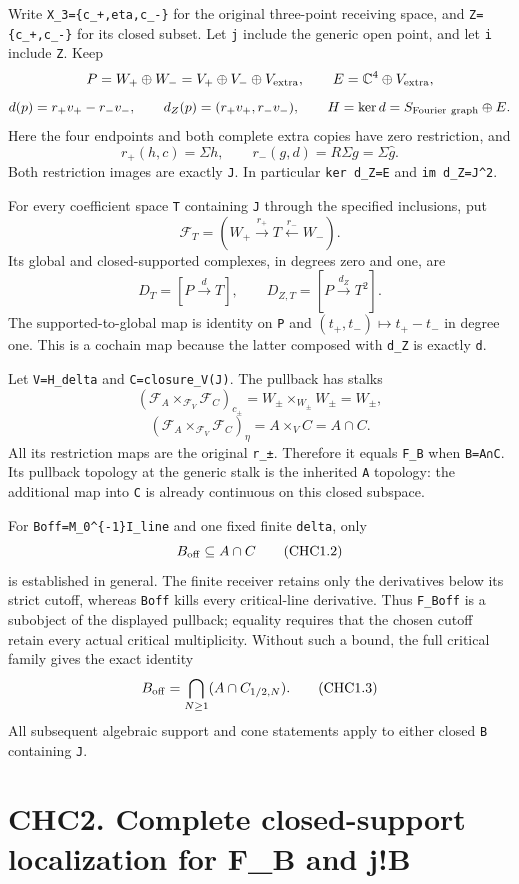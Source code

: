 Write \texttt{X\_3=\{c\_+,eta,c\_-\}} for the original three-point
receiving space, and \texttt{Z=\{c\_+,c\_-\}} for its closed subset. Let
\texttt{j} include the generic open point, and let \texttt{i} include
\texttt{Z}. Keep \[
P=W_+\oplus W_-
=V_+\oplus V_-\oplus V_{\rm extra},
\qquad
E=\mathbb C^4\oplus V_{\rm extra},
\] \[
d(p)=r_+v_+-r_-v_-,\qquad
d_Z(p)=(r_+v_+,r_-v_-),\qquad
H=\ker d=S_{\rm Fourier\ graph}\oplus E.
\] Here the four endpoints and both complete extra copies have zero
restriction, and \[
r_+(h,c)=\Sigma h,\qquad r_-(g,d)=R\Sigma g=\Sigma\widehat g.
\] Both restriction images are exactly \texttt{J}. In particular
\texttt{ker\ d\_Z=E} and \texttt{im\ d\_Z=J\^{}2}.

For every coefficient space \texttt{T} containing \texttt{J} through the
specified inclusions, put \[
\mathcal F_T=(W_+\xrightarrow{r_+}T\xleftarrow{r_-}W_-).
\] Its global and closed-supported complexes, in degrees zero and one,
are \[
D_T=[P\xrightarrow d T],\qquad
D_{Z,T}=[P\xrightarrow{d_Z}T^2].
\tag{CHC1.1}
\] The supported-to-global map is identity on \texttt{P} and
\((t_+,t_-)\mapsto t_+-t_-\) in degree one. This is a cochain map
because the latter composed with \texttt{d\_Z} is exactly \texttt{d}.

Let \texttt{V=H\_delta} and \texttt{C=closure\_V(J)}. The pullback has
stalks \[
(\mathcal F_A\times_{\mathcal F_V}\mathcal F_C)_{c_\pm}
=W_\pm\times_{W_\pm}W_\pm=W_\pm,
\] \[
(\mathcal F_A\times_{\mathcal F_V}\mathcal F_C)_\eta
=A\times_V C=A\cap C.
\] All its restriction maps are the original \texttt{r\_±}. Therefore it
equals \texttt{F\_B} when \texttt{B=A∩C}. Its pullback topology at the
generic stalk is the inherited \texttt{A} topology: the additional map
into \texttt{C} is already continuous on this closed subspace.

For \texttt{Boff=M\_0\^{}\{-1\}I\_line} and one fixed finite
\texttt{delta}, only \[
B_{\rm off}\subseteq A\cap C
\tag{CHC1.2}
\] is established in general. The finite receiver retains only the
derivatives below its strict cutoff, whereas \texttt{Boff} kills every
critical-line derivative. Thus \texttt{F\_Boff} is a subobject of the
displayed pullback; equality requires that the chosen cutoff retain
every actual critical multiplicity. Without such a bound, the full
critical family gives the exact identity \[
B_{\rm off}=\bigcap_{N\ge1}(A\cap C_{1/2,N}).
\tag{CHC1.3}
\] All subsequent algebraic support and cone statements apply to either
closed \texttt{B} containing \texttt{J}.

\section{CHC2. Complete closed-support localization for F\_B and
j!B}\label{chc2.-complete-closed-support-localization-for-f_b-and-jb}

